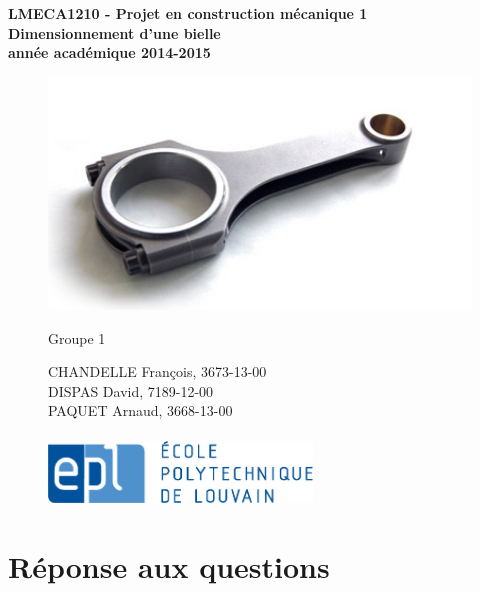 \documentclass[a4paper,oneside,12pt]{report}
\begin{document}
\begin{titlepage}
\hfill

\begin{center}
\Huge
\textbf{LMECA1210 - Projet en construction mécanique 1\\}
\vspace{0.5cm}
\huge
\textbf{Dimensionnement d'une bielle\\}
\Large
\vspace{0.5cm}
\textbf{année académique 2014-2015\\}
\vspace{0.5cm}
\begin{figure}[b!]
	\center
	\includegraphics[width=12cm]{bielle.jpg}
\end{figure}

\end{center}
\begin{figure}[b!]
\begin{Large}
	Groupe 1\\
\end{Large}
	CHANDELLE François, 3673-13-00\\
	DISPAS David, 7189-12-00\\
	PAQUET Arnaud, 3668-13-00\\
	\\
	\newline
	\center
	\includegraphics[width=7cm]{epl-logo.jpg}
\end{figure}
\end{titlepage}


\chapter{Réponse aux questions}
\end{document}
